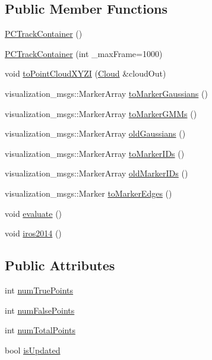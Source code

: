 \subsection*{\-Public \-Member \-Functions}
\begin{DoxyCompactItemize}
\item 
\hyperlink{class_p_c_track_container_a57b7ba43e31583d6e0c2660ce79c6e0a}{\-P\-C\-Track\-Container} ()
\item 
\hyperlink{class_p_c_track_container_aa3f42b51f7c0148dd8cf2936194ab9dc}{\-P\-C\-Track\-Container} (int \-\_\-max\-Frame=1000)
\item 
void \hyperlink{class_p_c_track_container_a4881bd9b8b1692193f07e48c3389c5db}{to\-Point\-Cloud\-X\-Y\-Z\-I} (\hyperlink{class_p_c_track_container_ad70a8e8d9236664790fd8d76a2ebeadb}{\-Cloud} \&cloud\-Out)
\item 
visualization\-\_\-msgs\-::\-Marker\-Array \hyperlink{class_p_c_track_container_acda2db186798fe99100c11c622d93f27}{to\-Marker\-Gaussians} ()
\item 
visualization\-\_\-msgs\-::\-Marker\-Array \hyperlink{class_p_c_track_container_a6b4e74ccf8ffbc81eef4843b5b300fa3}{to\-Marker\-G\-M\-Ms} ()
\item 
visualization\-\_\-msgs\-::\-Marker\-Array \hyperlink{class_p_c_track_container_ab62240a09d2587f15cf0f346bdac9b14}{old\-Gaussians} ()
\item 
visualization\-\_\-msgs\-::\-Marker\-Array \hyperlink{class_p_c_track_container_a5bd37d304d5fab465535c395d3c8a86f}{to\-Marker\-I\-Ds} ()
\item 
visualization\-\_\-msgs\-::\-Marker\-Array \hyperlink{class_p_c_track_container_a584a5f8b8043959c78f415f7b98d70bf}{old\-Marker\-I\-Ds} ()
\item 
visualization\-\_\-msgs\-::\-Marker \hyperlink{class_p_c_track_container_a4330fcbefe00381504c8493b0c8c4c4b}{to\-Marker\-Edges} ()
\item 
void \hyperlink{class_p_c_track_container_a661c9e504ba3f4a2e9b4bf5d12d5a76c}{evaluate} ()
\item 
void \hyperlink{class_p_c_track_container_a32a1137979b67b2bba51a768a6d2398b}{iros2014} ()
\end{DoxyCompactItemize}
\subsection*{\-Public \-Attributes}
\begin{DoxyCompactItemize}
\item 
int \hyperlink{class_p_c_track_container_a5ac828bfcaa2932955a67c3e478849c0}{num\-True\-Points}
\item 
int \hyperlink{class_p_c_track_container_a8e9b9d663f2227fad5f9a6743d8dd254}{num\-False\-Points}
\item 
int \hyperlink{class_p_c_track_container_a8289947fa7796de78ec1d84e7768db83}{num\-Total\-Points}
\item 
bool \hyperlink{class_p_c_track_container_a51514b479f4c23c13f412dc36766f73f}{is\-Updated}
\end{DoxyCompactItemize}
